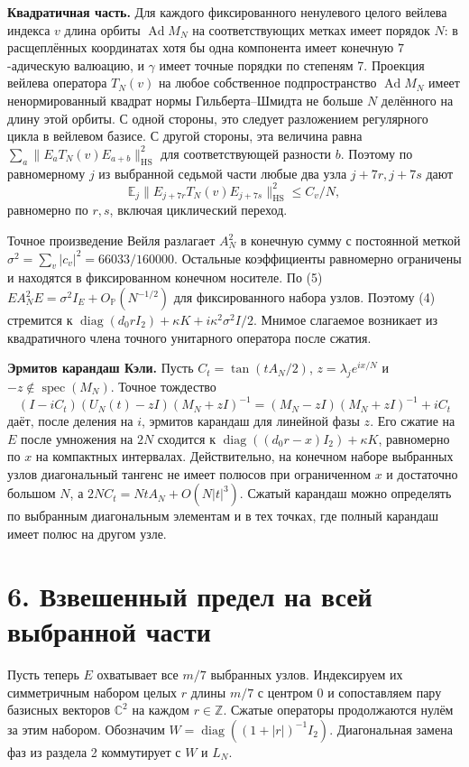 \documentclass[11pt,a4paper]{article}
\newcommand{\Z}{\mathbb Z}
\newcommand{\C}{\mathbb C}
\newcommand{\sect}[1]{\section*{\sffamily\color{ink}#1}}
\newcommand{\subt}[1]{\par\medskip\noindent\textbf{#1.}\quad}
\newcommand{\Ad}{\operatorname{Ad}}
\newcommand{\HS}{\mathrm{HS}}
\begin{document}
\subt{Квадратичная часть}
Для каждого фиксированного ненулевого целого вейлева индекса \(v\) длина орбиты \(\Ad M_N\) на соответствующих метках имеет порядок \(N\): в расщеплённых координатах хотя бы одна компонента имеет конечную \(7\)-адическую валюацию, и \(\gamma\) имеет точные порядки по степеням 7. Проекция вейлева оператора \(T_N(v)\) на любое собственное подпространство \(\Ad M_N\) имеет ненормированный квадрат нормы Гильберта--Шмидта не больше \(N\) делённого на длину этой орбиты. С одной стороны, это следует разложением регулярного цикла в вейлевом базисе. С другой стороны, эта величина равна \(\sum_a\|E_a T_N(v)E_{a+b}\|_{\HS}^2\) для соответствующей разности \(b\). Поэтому по равномерному \(j\) из выбранной седьмой части любые два узла \(j+7r,j+7s\) дают
\begin{equation}
        \mathbb E_j\|E_{j+7r} T_N(v) E_{j+7s}\|_{\HS}^2
                                      \le C_v/N,
                                                               \tag{5}
\end{equation}
равномерно по \(r,s\), включая циклический переход.

Точное произведение Вейля разлагает \(A_N^2\) в конечную сумму с постоянной меткой \(\sigma^2=\sum_v|c_v|^2=66033/160000\). Остальные коэффициенты равномерно ограничены и находятся в фиксированном конечном носителе. По (5) \(EA_N^2E=\sigma^2 I_E+O_{\mathbb P}(N^{-1/2})\) для фиксированного набора узлов. Поэтому (4) стремится к \(\operatorname{diag}(d_0 r I_2)+\kappa K+i\kappa^2\sigma^2 I/2\). Мнимое слагаемое возникает из квадратичного члена точного унитарного оператора после сжатия.

\subt{Эрмитов карандаш Кэли}
Пусть \(C_t=\tan(t A_N/2)\), \(z=\lambda_j e^{ix/N}\) и \(-z\notin\operatorname{spec}(M_N)\). Точное тождество
\[
  (I-iC_t)(U_N(t)-zI)(M_N+zI)^{-1}
        =(M_N-zI)(M_N+zI)^{-1}+iC_t
\]
даёт, после деления на \(i\), эрмитов карандаш для линейной фазы \(z\). Его сжатие на \(E\) после умножения на \(2N\) сходится к \(\operatorname{diag}((d_0r-x)I_2)+\kappa K\), равномерно по \(x\) на компактных интервалах. Действительно, на конечном наборе выбранных узлов диагональный тангенс не имеет полюсов при ограниченном \(x\) и достаточно большом \(N\), а \(2N C_t=N t A_N+O(N|t|^3)\). Сжатый карандаш можно определять по выбранным диагональным элементам и в тех точках, где полный карандаш имеет полюс на другом узле.
\newpage
\sect{6. Взвешенный предел на всей выбранной части}
Пусть теперь \(E\) охватывает все \(m/7\) выбранных узлов. Индексируем их симметричным набором целых \(r\) длины \(m/7\) с центром \(0\) и сопоставляем пару базисных векторов \(\C^2\) на каждом \(r\in\Z\). Сжатые операторы продолжаются нулём за этим набором. Обозначим \(W=\operatorname{diag}((1+|r|)^{-1}I_2)\). Диагональная замена фаз из раздела 2 коммутирует с \(W\) и \(L_N\).
\end{document}
